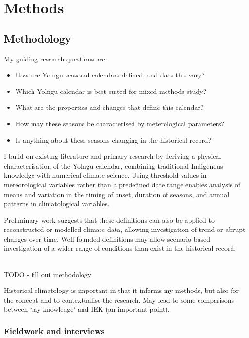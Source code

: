 \chapter{Methods}
\label{ch:methods}

\section{Methodology}

My guiding research questions are:
\begin{itemize}
\item How are Yolngu seasonal calendars defined, and does this vary?
\item Which Yolngu calendar is best suited for mixed-methods study?
\item What are the properties and changes that define this calendar?
\item How may these seasons be characterised by meterological parameters?
\item Is anything about these seasons changing in the historical record?
\end{itemize}

I build on existing literature and primary research by deriving a physical
characterisation of the Yolngu calendar, combining traditional Indigenous
knowledge with numerical climate science. Using threshold values in meteorological
variables rather than a predefined date range enables analysis of means and
variation in the timing of onset, duration of seasons, and annual patterns
in climatological variables.

Preliminary work suggests that these definitions can also be applied to
reconstructed or modelled climate data, allowing investigation of trend
or abrupt changes over time. Well-founded definitions may allow scenario-based
investigation of a wider range of conditions than exist in the historical record. 

~\\

TODO - fill out methodology

Historical climatology is important in that it informs my methods,
but also for the concept and to contextualise the research.  May lead to 
some comparisons between `lay knowledge' and IEK (an important point).\\



\subsection{Fieldwork and interviews}

